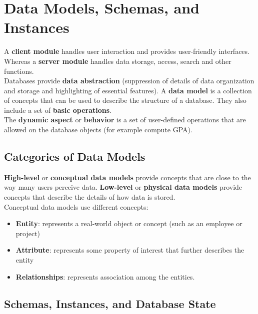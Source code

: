 
\section{Data Models, Schemas, and Instances}

A \textbf{client module} handles user interaction and provides user-friendly interfaces. Whereas a \textbf{server module} handles data storage, access, search and other functions.\\

Databases provide \textbf{data abstraction} (suppression of details of data organization and storage and highlighting of essential features). A \textbf{data model} is a collection of concepts that can be used to describe the structure of a database. They also include a set of \textbf{basic operations}.\\

The \textbf{dynamic aspect} or \textbf{behavior} is a set of user-defined operations that are allowed on the database objects (for example compute GPA).\\

\subsection{Categories of Data Models}

\textbf{High-level} or \textbf{conceptual data models} provide concepts that are close to the way many users perceive data. \textbf{Low-level} or \textbf{physical data models} provide concepts that describe the details of how data is stored.\\

Conceptual data models use different concepts:\\

\begin{itemize}
    \item \textbf{Entity}: represents a real-world object or concept (such as an employee or project)
    \item \textbf{Attribute}: represents some property of interest that further describes the entity
    \item \textbf{Relationships}: represents association among the entities. 
\end{itemize}

\subsection{Schemas, Instances, and Database State}

